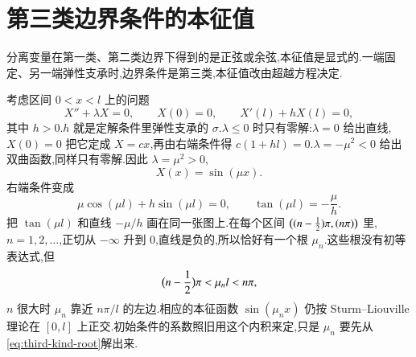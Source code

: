 \section{第三类边界条件的本征值}
分离变量在第一类、第二类边界下得到的是正弦或余弦,本征值是显式的.一端固定、另一端弹性支承时,边界条件是第三类,本征值改由超越方程决定.

考虑区间 $0<x<l$ 上的问题
\begin{equation}
  X''+\lambda X=0,
  \qquad
  X(0)=0,
  \qquad
  X'(l)+h X(l)=0,
\end{equation}
其中 $h>0$.$h$ 就是定解条件里弹性支承的 $\sigma$.$\lambda\leq 0$ 时只有零解:$\lambda=0$ 给出直线,$X(0)=0$ 把它定成 $X=cx$,再由右端条件得 $c(1+hl)=0$.$\lambda=-\mu^2<0$ 给出双曲函数,同样只有零解.因此 $\lambda=\mu^2>0$,
\begin{equation}
  X(x)=\sin(\mu x).
\end{equation}
右端条件变成
\begin{equation}
  \mu\cos(\mu l)+h\sin(\mu l)=0,
  \qquad
  \tan(\mu l)=-\frac{\mu}{h}.
  \label{eq:third-kind-root}
\end{equation}
把 $\tan(\mu l)$ 和直线 $-\mu/h$ 画在同一张图上.在每个区间 $\bigl((n-{\frac{1}{2}})\pi,(n\pi)\bigr)$ 里,$n=1,2,\ldots$,正切从 $-\infty$ 升到 $0$,直线是负的,所以恰好有一个根 $\mu_n$.这些根没有初等表达式,但
\begin{equation}
  \bigl(n-{\frac{1}{2}}\bigr)\pi < \mu_n l < n\pi,
\end{equation}
$n$ 很大时 $\mu_n$ 靠近 $n\pi/l$ 的左边.相应的本征函数 $\sin(\mu_n x)$ 仍按 Sturm--Liouville 理论在 $[0,l]$ 上正交.初始条件的系数照旧用这个内积来定,只是 $\mu_n$ 要先从\eqref{eq:third-kind-root}解出来.
